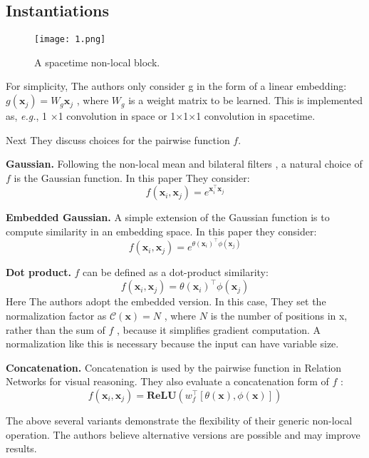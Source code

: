 \documentclass[10pt,twocolumn,letterpaper]{article}
\begin{document}
\subsection{Instantiations}
\begin{figure}[t]
	\texttt{[image: 1.png]}
	\centering
	\caption{A spacetime non-local block.}
	\label{fig1}
\end{figure}
For simplicity, The authors only consider g in the form of a linear
embedding: $g\left(\textbf{x}_j\right)=W_g\textbf{x}_j$ , where $W_g$ is a weight matrix
to be learned. This is implemented as, \textit{e.g.}, 1 $\times$1 convolution
in space or 1$\times$1$\times$1 convolution in spacetime.
\par
Next They discuss choices for the pairwise function $f$.
\par
\noindent \textbf{Gaussian.} Following the non-local mean \cite{buades2005non} and bilateral filters \cite{tomasi1998bilateral}, a natural choice of $f$ is the Gaussian function. In this paper They consider:
\begin{equation}
	f\left(\textbf{x}_i,\textbf{x}_j\right) = e^{\textbf{x}_i^{\top}\textbf{x}_j}
	\label{eq2}
\end{equation}
\par
\noindent \textbf{Embedded Gaussian.} A simple extension of the Gaussian function is to compute similarity in an embedding space. In
this paper they consider:
\begin{equation}
	f\left(\textbf{x}_i,\textbf{x}_j\right) =e^{\theta\left(\textbf{x}_i\right)^\top \phi\left(\textbf{x}_j\right)}
	\label{eq3}
\end{equation}
\par
\noindent \textbf{Dot product.} $f$ can be defined as a dot-product similarity:
\begin{equation}
	f\left(\textbf{x}_i,\textbf{x}_j\right)= \theta\left(\textbf{x}_i\right)^\top \phi\left(\textbf{x}_j\right)
	\label{eq4}
\end{equation}
Here The authors adopt the embedded version. In this case, They set the
normalization factor as $\mathcal{C}\left(\textbf{x}\right)=N$ , where $N$ is the number of
positions in x, rather than the sum of $f$ , because it simplifies
gradient computation. A normalization like this is necessary
because the input can have variable size.
\par
\noindent \textbf{Concatenation.} Concatenation is used by the pairwise function in Relation Networks  for visual reasoning. They also
evaluate a concatenation form of $f$ :
\begin{equation}
f\left(\textbf{x}_i,\textbf{x}_j\right)=\textbf{ReLU}\left(w_f^\top\left[\theta\left(\textbf{x}\right),\phi\left(\textbf{x}\right)\right]\right)
\label{eq5}
\end{equation}
\par
The above several variants demonstrate the flexibility
of their generic non-local operation. The authors believe alternative
versions are possible and may improve results.
\end{document}
